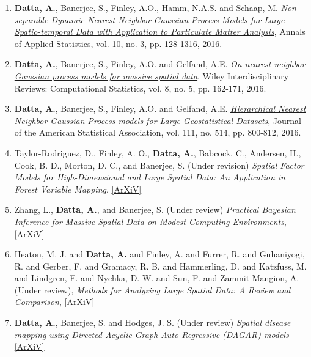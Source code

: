 \documentclass[11pt,a4paper,sans]{moderncv} %
\begin{document}
{\begin{enumerate}
\item \vskip 4mm \textbf{Datta, A.}, Banerjee, S., Finley, A.O., Hamm, N.A.S. and Schaap, M.  \href{https://projecteuclid.org/euclid.aoas/1475069608}{\em Non-separable Dynamic Nearest Neighbor Gaussian Process Models for Large Spatio-temporal Data with Application to Particulate Matter Analysis}, Annals of Applied Statistics, vol. 10, no. 3, pp. 128-1316, 2016.

\item \vskip 4mm \textbf {Datta, A.}, Banerjee, S., Finley, A.O. and Gelfand, A.E.  \href{http://onlinelibrary.wiley.com/doi/10.1002/wics.1383/abstract}{\em On nearest-neighbor Gaussian process models for massive spatial data}, Wiley Interdisciplinary Reviews: Computational Statistics, vol. 8, no. 5, pp. 162-171, 2016.

\item \vskip 4mm \textbf {Datta, A.}, Banerjee, S., Finley, A.O. and Gelfand, A.E.  \href{http://www.tandfonline.com/doi/abs/10.1080/01621459.2015.1044091}{\em Hierarchical Nearest Neighbor Gaussian Process models for Large Geostatistical Datasets}, Journal of the American Statistical Association, vol. 111, no. 514, pp. 800-812, 2016.

\item \vskip 4mm Taylor-Rodriguez, D., Finley, A. O.,  \textbf{Datta, A.}, Babcock, C., Andersen, H., Cook, B. D., Morton, D. C.,  and Banerjee, S. (Under revision) {\em Spatial Factor Models for High-Dimensional and Large Spatial Data: An Application in Forest Variable Mapping}, \href{https://arxiv.org/pdf/1801.02078.pdf}{[ArXiV]}

\item \vskip 4mm Zhang, L., \textbf{Datta, A.}, and Banerjee, S. (Under review) {\em Practical Bayesian Inference for Massive Spatial Data on Modest Computing Environments}, \href{https://arxiv.org/pdf/1802.00495.pdf}{[ArXiV]}

\item \vskip 4mm Heaton, M. J. and \textbf{Datta, A.} and Finley, A. and Furrer, R. and Guhaniyogi, R. and Gerber, F. and Gramacy, R. B. and Hammerling, D. and Katzfuss, M. and Lindgren, F. and Nychka, D. W. and Sun, F. and Zammit-Mangion, A. (Under review), {\em Methods for Analyzing Large Spatial Data: A Review and Comparison}, \href{https://arxiv.org/pdf/1710.05013.pdf}{[ArXiV]}

\item \vskip 4mm \textbf{Datta, A.}, Banerjee, S. and Hodges, J. S. (Under review) {\em Spatial disease mapping using Directed Acyclic Graph Auto-Regressive (DAGAR) models} \href{https://arxiv.org/pdf/1704.07848.pdf}{[ArXiV]}


\end{enumerate}}
\end{document}
